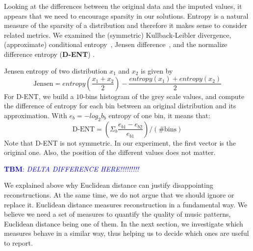\documentclass{article}
\newcommand{\FIXME}[2][FIXME]{\textcolor{blue}{\textbf{#1}: \emph{#2}}}
\begin{document}
Looking at the differences between the original data and the imputed
values, it appears that we need to encourage sparsity in our
solutions.  Entropy is a natural measure of the sparsity of a
distribution and therefore it makes sense to consider related metrics.
We examined the (symmetric) Kullback-Leibler divergence, (approximate)
conditional entropy~\cite{}, Jensen difference~\cite{Michel1994}, and
the normalize difference entropy (\textbf{D-ENT})
\cite{Mentzelopoulos2004}.

Jensen entropy of two distribution $x_1$ and $x_2$ is given by
\[
\mbox{Jensen} = entropy(\frac{x_1+x_2}{2}) - \frac{entropy(x_1) + entropy(x_2)}{2}
\]
For D-ENT, we build a $10$-bins histogram of the grey scale values,
and compute the difference of entropy for each bin between an original
distribution and its approximation. With $e_b = - log_2 b_b$
entropy of one bin, it means that:
\[
\mbox{D-ENT} = \left( \Sigma_b \frac{e_{b1} - e_{b2}}{e_{b1}} \right) / (\mbox{\# bins})
\]
Note that D-ENT is not symmetric. In our experiment, the first vector
is the original one. Also, the position of the different values does not
matter.

\FIXME[TBM]{DELTA DIFFERENCE HERE!!!!!!!!!}

We explained above why Euclidean distance can justify disappointing
reconstructions. At the same time, we do not argue that we should
ignore or replace it. Euclidean distance measures reconstruction in a
fundamental way. We believe we need a set of measures to quantify the
quality of music patterns, Euclidean distance being one of them. In
the next section, we investigate which measures behave in a similar
way, thus helping us to decide which ones are useful to report.

\end{document}
